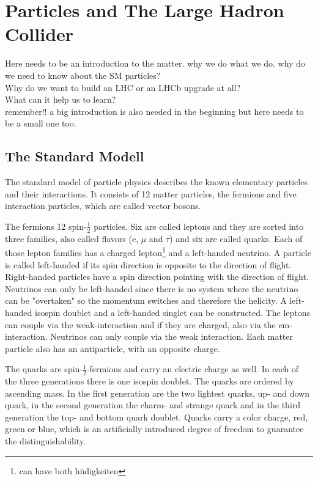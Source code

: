 \chapter{Particles and The Large Hadron Collider}
\label{sec:particleslhc}

Here needs to be an introduction to the matter. why we do what we do.
why do we need to know about the SM particles?\\
Why do we want to build an LHC or an LHCb upgrade at all?\\
What can it help us to learn?\\
remember!! a big introduction is also needed in the beginning but here needs to be a small one too.\\

\section{The Standard Modell}
\label{sec:sm}


The standard model of particle physics describes the known elementary particles and their interactions. It consists of 12 matter particles, the fermions
and five interaction particles, which are called vector bosons.

The fermions 12 spin-$\frac{1}{2}$ particles. Six are called leptons and they are sorted into three families, also called flavors (e, $\mu$ and $\tau$) and six are called quarks. Each of those lepton families has a charged lepton\footnote{can have both h\"ndigkeiten} and a left-handed neutrino.
A particle is called left-handed if its spin direction is opposite to the direction of flight. Right-handed particles have a spin direction pointing with the direction of flight.
Neutrinos can only be left-handed since there is no system where the neutrino can be "overtaken" so the momentum switches and therefore the helicity.
A left-handed isospin doublet and a left-handed singlet can be constructed.
The leptons can couple via the weak-interaction and if they are charged, also via the em-interaction. Neutrinos can only couple via the weak interaction.
Each matter particle also has an antiparticle, with an opposite charge.

The quarks are spin-$\frac{1}{2}$-fermions and carry an electric charge as well. In each of the three generations there is one isospin doublet. The quarks are ordered by ascending mass. In the first generation are the two lightest quarks,
up- and down quark, in the second generation the charm- and strange quark and
in the third generation the top- and bottom quark doublet.
Quarks carry a color charge, red, green or blue, which is an artificially introduced degree of freedom to guarantee the distinguishability.

